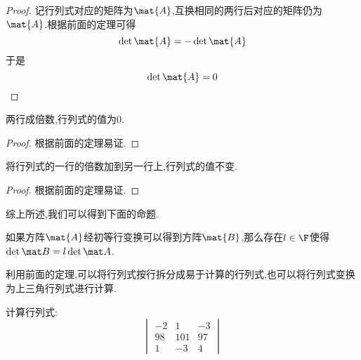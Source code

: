 \documentclass{ctexart}
\begin{document}
\begin{proof}
    记行列式对应的矩阵为$\mat{A}$,互换相同的两行后对应的矩阵仍为$\mat{A}$.根据前面的定理可得
    \[\det\mat{A}=-\det\mat{A}\]
    于是
    \[\det\mat{A}=0\]
\end{proof}
\begin{theorem}
    两行成倍数,行列式的值为$0$.
\end{theorem}
\begin{proof}
    根据前面的定理易证.
\end{proof}
\begin{theorem}
    将行列式的一行的倍数加到另一行上,行列式的值不变.
\end{theorem}
\begin{proof}
    根据前面的定理易证.
\end{proof}
综上所述,我们可以得到下面的命题.
\begin{theorem}
    如果方阵$\mat{A}$经初等行变换可以得到方阵$\mat{B}$,那么存在$l\in\F$使得$\det\mat B=l\det\mat A$.
\end{theorem}
利用前面的定理,可以将行列式按行拆分成易于计算的行列式,也可以将行列式变换为上三角行列式进行计算.
\begin{problem}
    计算行列式:
    \[\begin{vmatrix}
        -2&1&-3\\
        98&101&97\\
        1&-3&4
    \end{vmatrix}\]
\end{problem}
\end{document}
